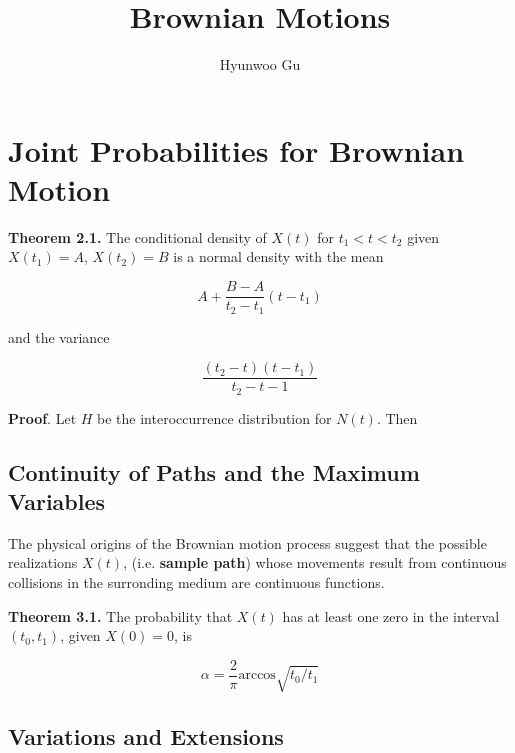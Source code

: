\documentclass[12pt]{article}
\theoremstyle{nonumberbreak}
\begin{document}
\title{\textbf{Brownian Motions}}
\author{Hyunwoo Gu}
\date{}

\maketitle



\section{Joint Probabilities for Brownian Motion}

\begin{theorem}
\textbf{Theorem 2.1.} The conditional density of $X(t)$ for $t_1 < t < t_2$ given $X(t_1) = A$, $X(t_2) = B$ is a normal density with the mean

$$
A + \frac{B-A}{t_2 - t_1} (t - t_1)
$$

and the variance

$$
\frac{(t_2 - t) (t-t_1)}{ t_2 - t-1}
$$
\end{theorem}




\textbf{Proof}. Let $H$ be the interoccurrence distribution for $N(t)$. Then 


\subsection{Continuity of Paths and the Maximum Variables}

The physical origins of the Brownian motion process suggest that the possible realizations $X(t)$, (i.e. \textbf{sample path}) whose movements result from continuous collisions in the surronding medium are continuous functions. 








\begin{theorem}
\textbf{Theorem 3.1.} The probability that $X(t)$ has at least one zero in the interval $(t_0, t_1)$, given $X(0) = 0$, is

$$
\alpha = \frac{2}{\pi} \mathrm{arccos} \sqrt{t_0/t_1}
$$
\end{theorem}


\subsection{Variations and Extensions}
\end{document}
